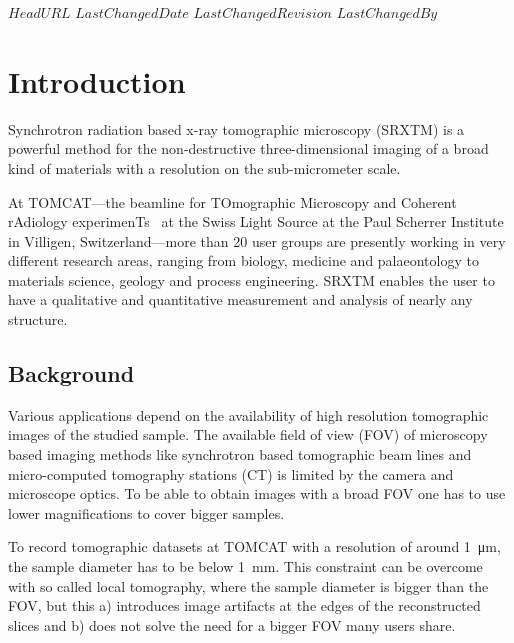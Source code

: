 \svnidlong
{$HeadURL$}
{$LastChangedDate$}
{$LastChangedRevision$}
{$LastChangedBy$}

\begin{center}
\end{center}

\section{Introduction}
Synchrotron radiation based x-ray tomographic microscopy (SRXTM) is a powerful method for the non-destructive three-dimensional imaging of a broad kind of materials with a resolution on the sub-micrometer scale.

At TOMCAT---the beamline for TOmographic Microscopy and Coherent rAdiology experimenTs~\cite{Stampanoni2007} at the Swiss Light Source at the Paul Scherrer Institute in Villigen, Switzerland---more than 20 user groups are presently working in very different research areas, ranging from biology, medicine and palaeontology to materials science, geology and process engineering. SRXTM enables the user to have a qualitative and quantitative measurement and analysis of nearly any structure.

\subsection{Background}
Various applications depend on the availability of high resolution tomographic images of the studied sample. The available field of view (FOV) of microscopy based imaging methods like synchrotron based tomographic beam lines and micro-computed tomography stations (\micro CT) is limited by the camera and microscope optics. To be able to obtain images with a broad FOV one has to use lower magnifications to cover bigger samples.

To record tomographic datasets at TOMCAT with a resolution of around \SI{1}{\micro\meter}, the sample diameter has to be below \SI{1}{\milli\meter}. This constraint can be overcome with so called local tomography, where the sample diameter is bigger than the FOV, but this a) introduces image artifacts at the edges of the reconstructed slices and b) does not solve the need for a bigger FOV many users share.


